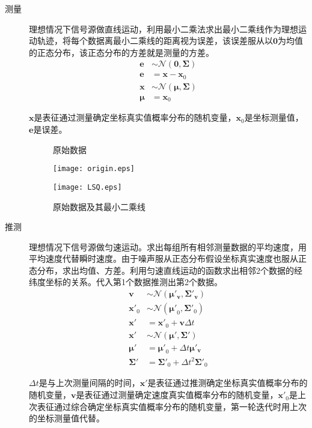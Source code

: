 \begin{description}
	\item[测量]理想情况下信号源做直线运动，利用最小二乘法求出最小二乘线作为理想运动轨迹，将每个数据离最小二乘线的距离视为误差，该误差服从以\(\bm{0}\)为均值的正态分布，该正态分布的方差就是测量的方差。
	\begin{align}
		\bm{e}	&	\sim\mathcal{N}(\bm{0},\bm{\Sigma})		\\
		\bm{e}	&	=\bm{x}-\bm{x}_0						\\
		\bm{x}	&	\sim\mathcal{N}(\bm{\mu},\bm{\Sigma})	\\
		\bm{\mu}	&	=\bm{x}_0
	\end{align}
	\par\(\bm{x}\)是表征通过测量确定坐标真实值概率分布的随机变量，\(\bm{x}_0\)是坐标测量值，\(\bm{e}\)是误差。
	\begin{figure}[htbp]
		\centering
		\begin{minipage}[htbp]{7.5cm}
			\centering
			\caption{原始数据}
			\texttt{[image: origin.eps]}
		\end{minipage}
		\begin{minipage}[htbp]{7.5cm}
			\centering
			\caption{原始数据及其最小二乘线}
			\texttt{[image: LSQ.eps]}
		\end{minipage}
	\end{figure}
	\item[推测]理想情况下信号源做匀速运动。求出每组所有相邻测量数据的平均速度，用平均速度代替瞬时速度。由于噪声服从正态分布假设坐标真实速度也服从正态分布，求出均值、方差。利用匀速直线运动的函数求出相邻2个数据的经纬度坐标的关系。代入第1个数据推测出第2个数据。
	\begin{align}
		\bm{v}		&	\sim\mathcal{N}(\bm{\mu'_v},\bm{\Sigma'_v})	\\
		\bm{x'}_0		&	\sim\mathcal{N}(\bm{\mu'}_0,\bm{\Sigma'}_0)	\\
		\bm{x'}		&	=\bm{x'}_0+\bm{v}\Delta t					\\
		\bm{x'}		&	\sim\mathcal{N}(\bm{\mu'},\bm{\Sigma'})		\\
		\bm{\mu'}		&	=\bm{\mu'}_0+\Delta t\bm{\mu'_v}				\\
		\bm{\Sigma'}	&	=\bm{\Sigma'}_0+\Delta t^2\bm{\Sigma'}_0
	\end{align}
	\par\(\Delta t\)是与上次测量间隔的时间，\(\bm{x}\bm{'}\)是表征通过推测确定坐标真实值概率分布的随机变量，\(\bm{v}\)是表征通过测量确定速度真实值概率分布的随机变量，\(\bm{x}\bm{'}_0\)是上次表征通过综合确定坐标真实值概率分布的随机变量，第一轮迭代时用上次的坐标测量值代替。

\end{description}
